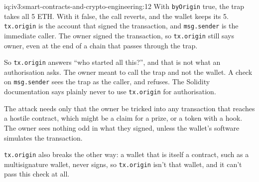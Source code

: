 \begin{solution}{iq:iv3:smart-contracts-and-crypto-engineering:12}
With \texttt{byOrigin} true, the trap takes all 5 ETH. With it false, the call reverts, and the wallet keeps its 5. \texttt{tx.origin} is the account that signed the transaction, and \texttt{msg.sender} is the immediate caller. The owner signed the transaction, so \texttt{tx.origin} still says owner, even at the end of a chain that passes through the trap.

So \texttt{tx.origin} answers ``who started all this?'', and that is not what an authorisation asks. The owner meant to call the trap and not the wallet. A check on \texttt{msg.sender} sees the trap as the caller, and refuses. The Solidity documentation says plainly never to use \texttt{tx.origin} for authorisation.

The attack needs only that the owner be tricked into any transaction that reaches a hostile contract, which might be a claim for a prize, or a token with a hook. The owner sees nothing odd in what they signed, unless the wallet's software simulates the transaction.

\texttt{tx.origin} also breaks the other way: a wallet that is itself a contract, such as a multisignature wallet, never signs, so \texttt{tx.origin} isn't that wallet, and it can't pass this check at all.

\end{solution}

